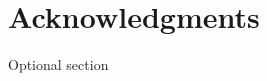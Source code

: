 \documentclass{acm_proc_article-sp}
\begin{document}
\section{Acknowledgments}
Optional section

%

%
%


\end{document}
